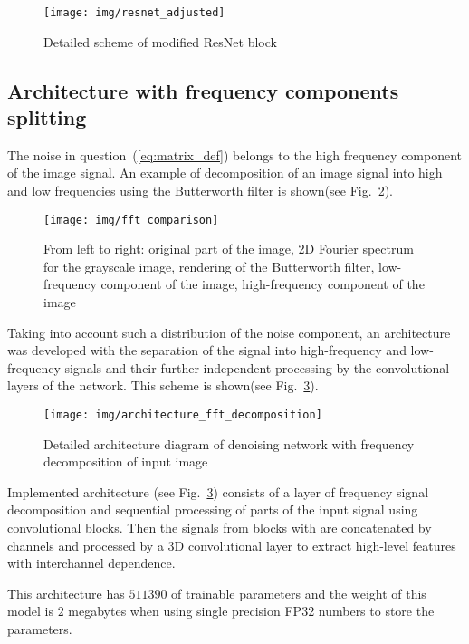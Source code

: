 \documentclass[runningheads]{llncs}
\begin{document}
\begin{figure}
	\centering
	\texttt{[image: img/resnet\_adjusted]}
	\caption{Detailed scheme of modified ResNet block} 
	\label{fig:detail_adjuster_resnet_block}
\end{figure}


\subsection{Architecture with frequency components splitting}
\label{sec:architecture}

The noise in question~(\ref{eq:matrix_def}) belongs to the high frequency component of the image signal. An example of decomposition of an image signal into high and low frequencies using the Butterworth filter is shown(see Fig.~\ref {fig:fft_comparison}).

\begin{figure}
	\centering
	\texttt{[image: img/fft\_comparison]}
	\caption{From left to right: original part of the image, 2D Fourier spectrum for the grayscale image, rendering of the Butterworth filter, low-frequency component of the image, high-frequency component of the image}
	\label{fig:fft_comparison}
\end{figure}

Taking into account such a distribution of the noise component, an architecture was developed with the separation of the signal into high-frequency and low-frequency signals and their further independent processing by the convolutional layers of the network. This scheme is shown(see Fig.~\ref{fig:architecture_fft_decomposition}).

\begin{figure}
	\centering
	\texttt{[image: img/architecture\_fft\_decomposition]}
	\caption{Detailed architecture diagram of denoising network with frequency decomposition of input image}
	\label{fig:architecture_fft_decomposition}
\end{figure}

Implemented architecture (see Fig.~\ref{fig:architecture_fft_decomposition}) consists of a layer of frequency signal decomposition and sequential processing of parts of the input signal using convolutional blocks. Then the signals from blocks with are concatenated by channels and processed by a 3D convolutional layer to extract high-level features with interchannel dependence.

This architecture has $511390$ of trainable parameters and the weight of this model is $2$ megabytes when using single precision FP32 numbers to store the parameters.
\end{document}
